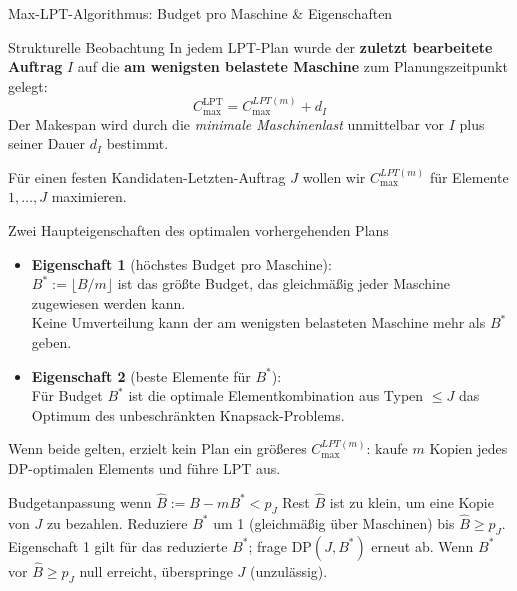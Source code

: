 \documentclass[fleqn,11pt,aspectratio=43]{beamer}
\newcommand{\Clpt}{C_{\max}^{\mathrm{LPT}}}
\begin{document}
\begin{frame}[shrink=45]{Max-LPT-Algorithmus: Budget pro Maschine \& Eigenschaften}
  \begin{block}{Strukturelle Beobachtung}
    In jedem LPT-Plan wurde der \textbf{zuletzt bearbeitete Auftrag} $I$ auf die \textbf{am wenigsten belastete Maschine} zum Planungszeitpunkt gelegt:
    \[\Clpt = C_{\max}^{LPT(m)} + d_I\]
    Der Makespan wird durch die \emph{minimale Maschinenlast} unmittelbar vor $I$ plus seiner Dauer $d_I$ bestimmt.
  \end{block}
  Für einen festen Kandidaten-Letzten-Auftrag $J$ wollen wir $C_{\max}^{LPT(m)}$ für Elemente $1,\ldots,J$ maximieren.
  \begin{block}{Zwei Haupteigenschaften des optimalen vorhergehenden Plans}
    \begin{itemize}
      \item \textbf{Eigenschaft 1} (höchstes Budget pro Maschine):\\
            $B^* := \lfloor B/m \rfloor$ ist das größte Budget, das gleichmäßig jeder Maschine zugewiesen werden kann.\\
            Keine Umverteilung kann der am wenigsten belasteten Maschine mehr als $B^*$ geben.
      \item \textbf{Eigenschaft 2} (beste Elemente für $B^*$):\\
            Für Budget $B^*$ ist die optimale Elementkombination aus Typen $\leq J$ das Optimum des unbeschränkten Knapsack-Problems.
    \end{itemize}
    Wenn beide gelten, erzielt kein Plan ein größeres $C_{\max}^{LPT(m)}$: kaufe $m$ Kopien jedes DP-optimalen Elements und führe LPT aus.
  \end{block}
  \begin{block}{Budgetanpassung wenn $\hat{B} := B - mB^* < p_J$}
    \small Rest $\hat{B}$ ist zu klein, um eine Kopie von $J$ zu bezahlen.
    Reduziere $B^*$ um 1 (gleichmäßig über Maschinen) bis $\hat{B} \geq p_J$.
    Eigenschaft 1 gilt für das reduzierte $B^*$; frage $\mathrm{DP}(J,B^*)$ erneut ab.
    Wenn $B^*$ vor $\hat{B} \geq p_J$ null erreicht, überspringe $J$ (unzulässig).
  \end{block}
\end{frame}
\end{document}

